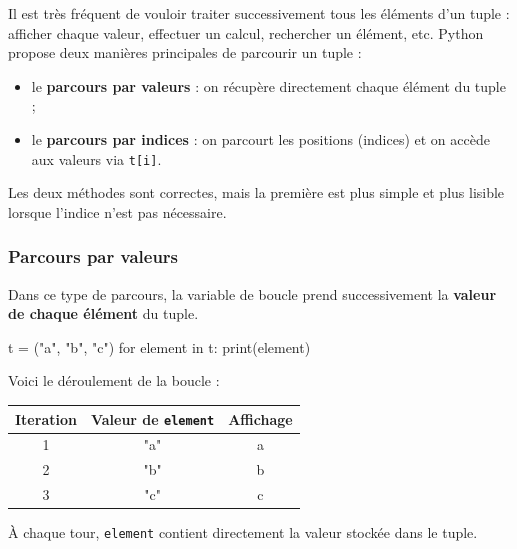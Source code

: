 \documentclass[11pt]{article}
\begin{document}
	
	
	Il est très fréquent de vouloir traiter successivement tous les éléments d’un tuple : afficher
	chaque valeur, effectuer un calcul, rechercher un élément, etc.  
	Python propose deux manières principales de parcourir un tuple :
	
	\begin{itemize}
		\item le \textbf{parcours par valeurs} : on récupère directement chaque élément du tuple ;
		\item le \textbf{parcours par indices} : on parcourt les positions (indices) et on accède aux valeurs via \texttt{t[i]}.
	\end{itemize}
	
	Les deux méthodes sont correctes, mais la première est plus simple et plus lisible lorsque l’indice n’est pas nécessaire.
	
	\subsubsection*{Parcours par valeurs}
	
	Dans ce type de parcours, la variable de boucle prend successivement la \textbf{valeur de chaque élément} du tuple.
	
	\begin{python}
		t = ("a", "b", "c")
		for element in t:
			print(element)\end{python}
	
	Voici le déroulement de la boucle :
	
	\begin{center}
		\begin{tabular}{|c|c|c|}
			\hline
			\textbf{Iteration} & \textbf{Valeur de \texttt{element}} & \textbf{Affichage}\\
			\hline
			1 & "a" & a \\
			\hline
			2 & "b" & b \\
			\hline
			3 & "c" & c \\
			\hline
		\end{tabular}
	\end{center}
	
	À chaque tour, \texttt{element} contient directement la valeur stockée dans le tuple.
	
\end{document}

